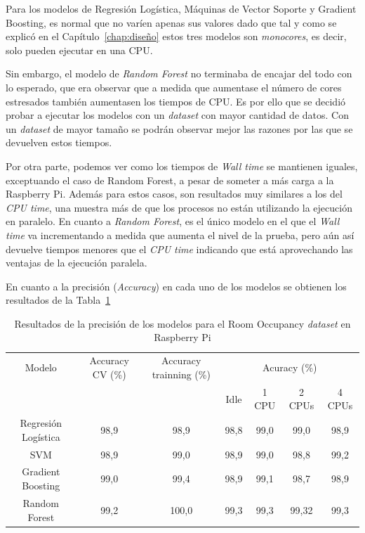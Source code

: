 \documentclass[a4paper, 12pt]{book}
\begin{document}
Para los modelos de Regresión Logística, Máquinas de Vector Soporte y Gradient Boosting, es normal que no varíen apenas sus valores dado que tal y como se explicó en el Capítulo~\ref{chap:diseño} estos tres modelos son \textit{monocores}, es decir, solo pueden ejecutar en una CPU. 

Sin embargo, el modelo de \textit{Random Forest} no terminaba de encajar del todo con lo esperado, que era observar que a medida que aumentase el número de cores estresados también aumentasen los tiempos de CPU. Es por ello que se decidió probar a ejecutar los modelos con un \textit{dataset} con mayor cantidad de datos. Con un \textit{dataset} de mayor tamaño se podrán observar mejor las razones por las que se devuelven estos tiempos.

Por otra parte, podemos ver como los tiempos de \textit{Wall time} se mantienen iguales, exceptuando el caso de Random Forest, a pesar de someter a más carga a la Raspberry Pi. Además para estos casos, son resultados muy similares a los del \textit{CPU time}, una muestra más de que los procesos no están utilizando la ejecución en paralelo. En cuanto a \textit{Random Forest}, es el único modelo en el que el \textit{Wall time} va incrementando a medida que aumenta el nivel de la prueba, pero aún así devuelve tiempos menores que el \textit{CPU time} indicando que está aprovechando las ventajas de la ejecución paralela. 

En cuanto a la precisión (\textit{Accuracy}) en cada uno de los modelos se obtienen los resultados de la Tabla~\ref{tab:acc_Occraspberry}\\
\begin{table}[htb]
\renewcommand{\arraystretch}{1.5}
\begin{adjustbox}{width=\textwidth}
\centering
    \begin{tabular}{c  c  c  c  c  c  c}
    \hline
    Modelo & Accuracy CV (\%) & Accuracy trainning (\%) & \multicolumn{4}{c}{Acuracy (\%)} \\
    \cline{4-7}
     &   &   &  Idle & 1 CPU & 2 CPUs & 4 CPUs \\
     \hline
     Regresión Logística & 98,9 & 98,9 & 98,8 & 99,0 & 99,0 & 98,9\\
     SVM & 98,9 & 99,0 & 98,9 & 99,0 & 98,8 & 99,2\\
     Gradient Boosting & 99,0 & 99,4 & 98,9 & 99,1 & 98,7 & 98,9\\
     Random Forest & 99,2 & 100,0 & 99,3 & 99,3 & 99,32 & 99,3\\
    \hline
    \end{tabular}
\end{adjustbox}
\caption{Resultados de la precisión de los modelos para el Room Occupancy \textit{dataset} en Raspberry Pi}
\label{tab:acc_Occraspberry}
\end{table}
\end{document}
